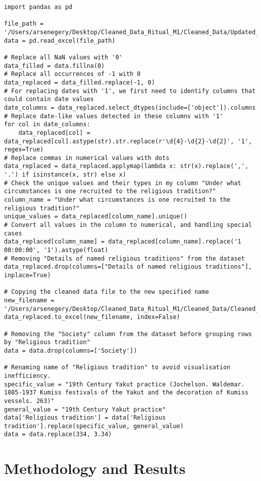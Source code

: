 \documentclass[12pt]{report}
\begin{document}
	\begin{lstlisting}
import pandas as pd
		
file_path = '/Users/arsenegery/Desktop/Cleaned_Data_Ritual_M1/Cleaned_Data/Updated_Cleaned_HRAF_Rituals_Dataset.xlsx'
data = pd.read_excel(file_path)
		
# Replace all NaN values with '0'
data_filled = data.fillna(0)
# Replace all occurrences of -1 with 0
data_replaced = data_filled.replace(-1, 0)
# For replacing dates with '1', we first need to identify columns that could contain date values
date_columns = data_replaced.select_dtypes(include=['object']).columns
# Replace date-like values detected in these columns with '1'
for col in date_columns:
	data_replaced[col] = data_replaced[col].astype(str).str.replace(r'\d{4}-\d{2}-\d{2}', '1', regex=True)
# Replace commas in numerical values with dots
data_replaced = data_replaced.applymap(lambda x: str(x).replace(',', '.') if isinstance(x, str) else x)
# Check the unique values and their types in my column "Under what circumstances is one recruited to the religious tradition?"
column_name = "Under what circumstances is one recruited to the religious tradition?"
unique_values = data_replaced[column_name].unique()
# Convert all values in the column to numerical, and handling special cases
data_replaced[column_name] = data_replaced[column_name].replace('1 00:00:00', '1').astype(float)
# Removing "Details of named religious traditions" from the dataset
data_replaced.drop(columns=["Details of named religious traditions"], inplace=True)
		
# Copying the cleaned data file to the new specified name
new_filename = '/Users/arsenegery/Desktop/Cleaned_Data_Ritual_M1/Cleaned_Data/Cleaned_Data_HN_Master.xlsx'
data_replaced.to_excel(new_filename, index=False)
		
# Removing the "Society" column from the dataset before grouping rows by "Religious tradition"
data = data.drop(columns=['Society'])
		
# Renaming name of "Religious tradition" to avoid visualisation inefficiency. 
specific_value = "19th Century Yakut practice (Jochelson. Waldemar. 1885-1937 Kumiss festivals of the Yakut and the decoration of Kumiss vessels. 263)"
general_value = "19th Century Yakut practice"
data['Religious tradition'] = data['Religious tradition'].replace(specific_value, general_value)
data = data.replace(334, 3.34)
	\end{lstlisting} 
	
	\chapter{Methodology and Results}
\end{document}

